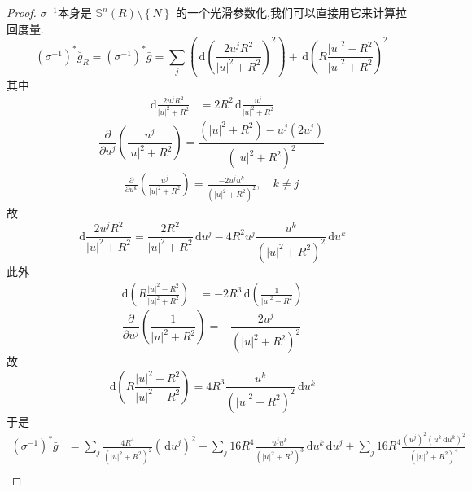 \documentclass[../../几何与拓扑.tex]{subfiles}
\begin{document}
\begin{proof}
    \(   \sigma ^{-1}  \)本身是 \(  \mathbb{S}^{n}\left( R \right)\setminus \left\{ N \right\}   \)  的一个光滑参数化,我们可以直接用它来计算拉回度量.
     \[
      \left( \sigma ^{-1} \right)^{*}  \overset{\scriptstyle\circ}{g}_{R}= \left(  \sigma ^{-1}  \right)^{*}\bar{g}=  \sum _{j}\left( \,\mathrm{d}  \left( \frac{2u^{j}R^{2} }{ \left| u \right|^{2}+ R^{2} }  \right) ^{2} \right)+  \,\mathrm{d} \left( R\frac{\left| u \right|^{2}-R^{2}  }{ \left| u \right|^{2}+ R^{2} }  \right)  ^{2}
     \]其中 \[
     \begin{aligned}
     \,\mathrm{d} \frac{2u^{j}R^{2} }{ \left| u \right|^{2}+ R^{2} }  & = 2R^{2} \,\mathrm{d} \frac{u^{j} }{\left| u \right|^{2}+ R^{2}  } 
     \end{aligned}
     \] \[
    \frac{\partial }{\partial u^{j}} \left( \frac{u^{j} }{\left| u \right|^{2}+ R^{2}  }  \right) = \frac{\left( \left| u \right|^{2}+ R^{2}  \right)-u^{j} \left( 2u^{j} \right)  }{ \left( \left| u \right|^{2}+ R^{2}  \right) ^{2}} 
     \] \[
     \begin{aligned}
     \frac{\partial }{\partial u^{k}}  \left( \frac{u^{j} }{\left| u \right|^{2}+ R^{2}  }  \right)= \frac{-2u^{j}u^{k} }{\left( \left| u \right|^{2}  + R^{2}\right)^{2}  }  ,\quad k\neq j
     \end{aligned}
     \]故 \[
     \,\mathrm{d} \frac{2u^{j}R^{2} }{\left| u \right|^{2}+ R^{2}  }=  \frac{2R^{2}}{\left| u \right|^{2}+ R^{2} }\,\mathrm{d} u^{j}-4R^{2}u^{j}\frac{u^{k} }{\left( \left| u \right|^{2}+ R^{2}  \right) ^{2} }\,\mathrm{d} u^{k} 
     \] 此外 \[
     \begin{aligned}
     \,\mathrm{d} \left( R \frac{\left| u \right|^{2}-R^{2}  }{\left| u \right|^{2}+ R^{2}  }  \right)& =-2 R^{3} \,\mathrm{d} \left(\frac{1 }{\left| u \right|^{2}+ R^{2}  }  \right)
     \end{aligned}
     \] \[
     \frac{\partial }{\partial u^{j}} \left( \frac{1 }{\left| u \right|^{2}+ R^{2}  }  \right)= - \frac{2u^{j} }{\left( \left| u \right|^{2}+ R^{2}  \right)^{2}  }  
     \]故 \[
     \,\mathrm{d} \left( R \frac{\left| u \right|^{2}-R^{2}  }{ \left| u \right|^{2}+ R^{2} }  \right)=  4R^{3}\frac{u^{k} }{\left( \left| u \right|^{2}+ R^{2} \right)^{2}   }\,\mathrm{d} u^{k}  
     \]于是 \[
     \begin{aligned}
     \left(  \sigma ^{-1}  \right)^{*}\bar{g}& =\sum _{j} \frac{4R^{4} }{\left( \left| u \right|^{2}+ R^{2}  \right)^{2}  }\left( \,\mathrm{d} u^{j} \right)^{2}-\sum _{j}16R^{4}\frac{u^{j}u^{k} }{\left( \left| u \right|^{2}+ R^{2}  \right)^{3}  }   \,\mathrm{d} u^{k}\,\mathrm{d} u^{j}+ \sum _{j}16R^{4} \frac{\left( u^{j} \right)^{2} \left( u^{k}\,\mathrm{d} u^{k} \right)^{2}   }{ \left( \left| u \right|^{2}+ R^{2}  \right)^{4} } \\ 

\end{aligned}\]
\end{proof}
\end{document}
